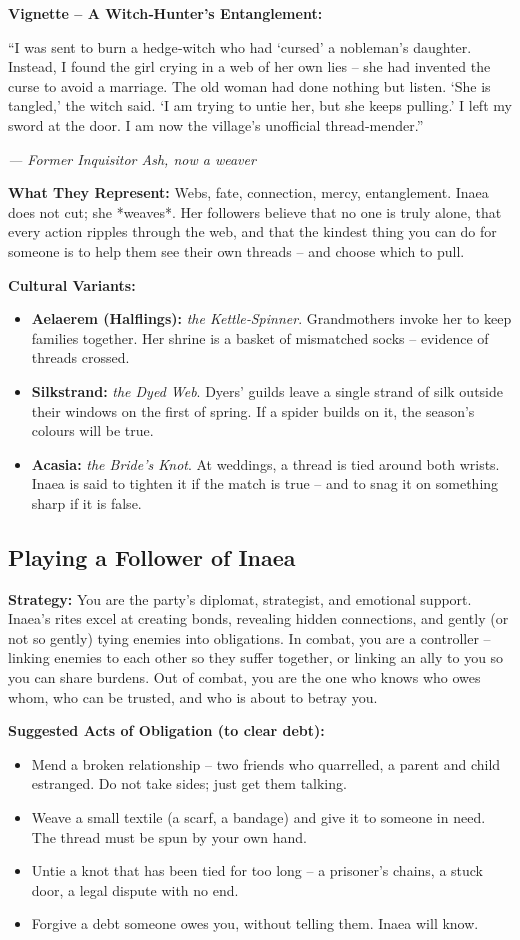 \documentclass[10pt,a5paper]{book}
\begin{document}
\textbf{Vignette – A Witch‑Hunter’s Entanglement:}
\epigraph{“I was sent to burn a hedge‑witch who had ‘cursed’ a nobleman’s daughter. Instead, I found the girl crying in a web of her own lies – she had invented the curse to avoid a marriage. The old woman had done nothing but listen. ‘She is tangled,’ the witch said. ‘I am trying to untie her, but she keeps pulling.’ I left my sword at the door. I am now the village’s unofficial thread‑mender.”}{\textit{— Former Inquisitor Ash, now a weaver}}

\textbf{What They Represent:} Webs, fate, connection, mercy, entanglement. Inaea does not cut; she *weaves*. Her followers believe that no one is truly alone, that every action ripples through the web, and that the kindest thing you can do for someone is to help them see their own threads – and choose which to pull.

\textbf{Cultural Variants:}
\begin{itemize}
    \item \textbf{Aelaerem (Halflings):} \textit{the Kettle‑Spinner}. Grandmothers invoke her to keep families together. Her shrine is a basket of mismatched socks – evidence of threads crossed.
    \item \textbf{Silkstrand:} \textit{the Dyed Web}. Dyers’ guilds leave a single strand of silk outside their windows on the first of spring. If a spider builds on it, the season’s colours will be true.
    \item \textbf{Acasia:} \textit{the Bride’s Knot}. At weddings, a thread is tied around both wrists. Inaea is said to tighten it if the match is true – and to snag it on something sharp if it is false.
\end{itemize}

\subsection*{Playing a Follower of Inaea}

\textbf{Strategy:} You are the party’s diplomat, strategist, and emotional support. Inaea’s rites excel at creating bonds, revealing hidden connections, and gently (or not so gently) tying enemies into obligations. In combat, you are a controller – linking enemies to each other so they suffer together, or linking an ally to you so you can share burdens. Out of combat, you are the one who knows who owes whom, who can be trusted, and who is about to betray you.

\textbf{Suggested Acts of Obligation (to clear debt):}
\begin{itemize}
    \item Mend a broken relationship – two friends who quarrelled, a parent and child estranged. Do not take sides; just get them talking.
    \item Weave a small textile (a scarf, a bandage) and give it to someone in need. The thread must be spun by your own hand.
    \item Untie a knot that has been tied for too long – a prisoner’s chains, a stuck door, a legal dispute with no end.
    \item Forgive a debt someone owes you, without telling them. Inaea will know.
\end{itemize}
\end{document}
